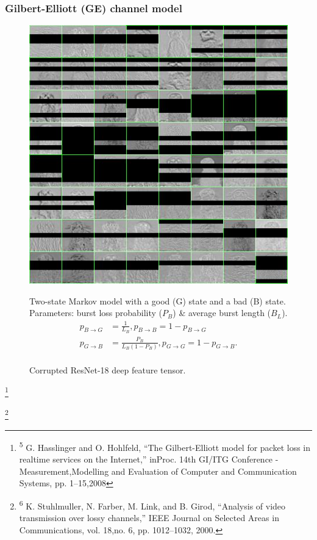 \documentclass[aspectratio=169]{beamer}
\newcommand\blfootnote[1]{%
	\begingroup
	\renewcommand\thefootnote{}\footnote{#1}%
	\addtocounter{footnote}{-1}%
	\endgroup
}
\begin{document}
\begin{frame}
\frametitle{Gilbert-Elliott (GE) channel model}
    	\begin{figure}
		\begin{minipage}{.37\textwidth}
		\centering
			\includegraphics[width=0.8\linewidth]{tileddamagedgridm.jpg}
			\caption{Corrupted ResNet-18 deep feature tensor.}
		\end{minipage}\hfill
		\begin{minipage}{.48\textwidth}
			Two-state Markov model with a good (G) state and a bad (B) state. Parameters: burst loss probability ($P_B$) \& average burst length ($B_L$). \cite{5755057,stuhlmuller2000analysis} 
			\begin{equation}
			\begin{split}
			p_{B\to G} & = \frac{1}{L_B},p_{B\to B} = 1-p_{B\to G}\\
			p_{G\to B} & = \frac{P_B}{L_B(1-P_B)},p_{G\to G} = 1-p_{G\to B}.\\
			\end{split}
			\end{equation} 
		\end{minipage}
	\end{figure}
	\blfootnote{\tiny \textsuperscript{5} G. Hasslinger and O. Hohlfeld, ``The Gilbert-Elliott model for packet loss in realtime services on the Internet,” inProc. 14th GI/ITG Conference - Measurement,Modelling and Evaluation of Computer and Communication Systems, pp. 1–15,2008} \blfootnote{\tiny \textsuperscript{6} K. Stuhlmuller, N. Farber, M. Link, and B. Girod, ``Analysis of video transmission over lossy channels,” IEEE Journal on Selected Areas in Communications, vol. 18,no. 6, pp. 1012–1032, 2000.}
\end{frame}
\end{document}
